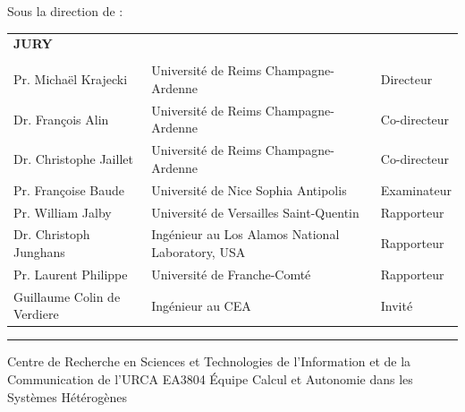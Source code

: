 \documentclass[11pt,a4paper]{book}
\begin{document}
{%
{
	Sous la direction de :\\ 
	\textbf{\phdDirector}
	\vspace{0.5cm}
	\vspace{\fill}
}

{
\normalsize
\begin{tabular}{l l l}
		\textbf{JURY} &  & \\
		&&\\
		Pr. Michaël Krajecki & Université de Reims Champagne-Ardenne & Directeur \\
		Dr. François Alin & Université de Reims Champagne-Ardenne & Co-directeur  \\
		Dr. Christophe Jaillet & Université de Reims Champagne-Ardenne & Co-directeur \\
		Pr. Françoise Baude & Université de Nice Sophia Antipolis& Examinateur\\
		Pr. William Jalby & Université de Versailles Saint-Quentin & Rapporteur\\
		Dr. Christoph Junghans & Ingénieur au Los Alamos National Laboratory, USA & Rapporteur \\
		Pr. Laurent Philippe & Université de Franche-Comté & Rapporteur \\ 		
		Guillaume Colin de Verdiere & Ingénieur au CEA & Invit\'e
\end{tabular}
\vspace{0.5cm}
\hrule
\vspace{0.3cm}
}

{
	Centre de Recherche en Sciences et Technologies de l'Information et de la Communication de l'URCA EA3804
}
{
	\'Equipe Calcul et Autonomie dans les Systèmes Hétérogènes
}

}

\clearpage 
{}
\thispagestyle{empty}

\frontmatter




%


\tableofcontents

\mainmatter
\end{document}
